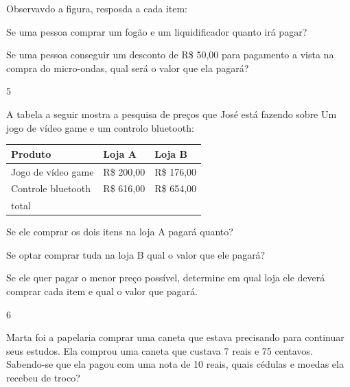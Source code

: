 \begin{escolha}
Observavdo a figura, resposda a cada item:

\begin{escolha}

\item
  Se uma pessoa comprar um fogão e um liquidificador quanto irá pagar?

\item
  Se uma pessoa conseguir um desconto de R\$ 50,00 para pagamento a
  vista na compra do micro-ondas, qual será o valor que ela pagará?

\end{escolha}

\num{5}

A tabela a seguir mostra a pesquisa de preços que José está fazendo
sobre Um jogo de vídeo game e um controlo bluetooth:

\begin{longtable}[]{@{}lll@{}}
\toprule
Produto & Loja A & Loja B\tabularnewline
\midrule
\endhead
Jogo de vídeo game & R\$ 200,00 & R\$ 176,00\tabularnewline
Controle bluetooth & R\$ 616,00 & R\$ 654,00\tabularnewline
total & &\tabularnewline
\bottomrule
\end{longtable}

\begin{escolha}

\item
  Se ele comprar os dois itens na loja A pagará quanto?

\item
  Se optar comprar tuda na loja B qual o valor que ele pagará?

\item
  Se ele quer pagar o menor preço possível, determine em qual loja ele
  deverá comprar cada item e qual o valor que pagará.
\end{escolha}

\num{6}

Marta foi a papelaria comprar uma caneta que estava precisando para
continuar seus estudos. Ela comprou uma caneta que custava 7 reais e 75
centavos. Sabendo-se que ela pagou com uma nota de 10 reais, quais
cédulas e moedas ela recebeu de troco?



\end{escolha}
